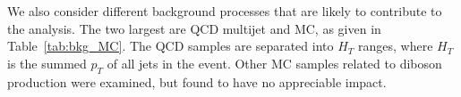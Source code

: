 \begin{table}[htb]
\begin{center}
\begin{tabular}{l|c|c}
      \hline
      \hline
    \end{tabular}
  \end{center}
\end{table}

We also consider different background processes that are likely to contribute to the analysis. The two largest are QCD multijet and \ttbar MC, as given in Table~\ref{tab:bkg_MC}. The QCD samples are separated into $H_{T}$ ranges, where $H_{T}$ is the summed $p_{T}$ of all jets in the event. Other MC samples related to diboson production were examined, but found to have no appreciable impact.

